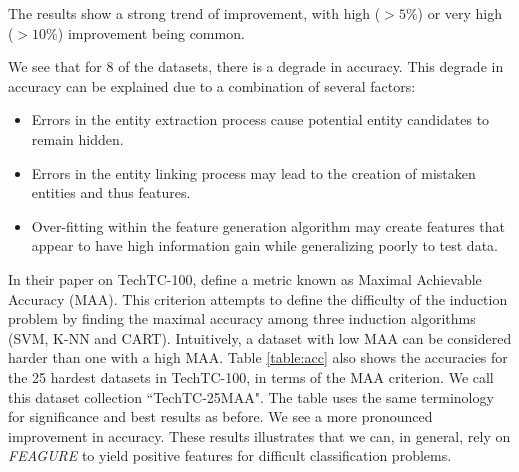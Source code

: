 \documentclass{article}
\theoremstyle{definition}
\begin{document}
The results show a strong trend of improvement, with high ($> 5\%$) or very high ($>10\%$) improvement being common.

We see that for 8 of the datasets, there is a degrade in accuracy. This degrade in accuracy can be explained due to a combination of several factors:
\begin{itemize}
	\item Errors in the entity extraction process cause potential entity candidates to remain hidden.%
	\item Errors in the entity linking process may lead to the creation of mistaken entities and thus features. %
	\item Over-fitting within the feature generation algorithm may create features that appear to have high information gain while generalizing poorly to test data.
\end{itemize} 

In their paper on TechTC-100, \cite{gabrilovich2004text} define a metric known as Maximal Achievable Accuracy (MAA). This criterion attempts to define the difficulty of the induction problem by finding the maximal accuracy among three induction algorithms (SVM, K-NN and CART).
Intuitively, a dataset with low MAA can be considered harder than one with a high MAA.%
Table \ref{table:acc} also shows the accuracies for the 25 hardest datasets in TechTC-100, in terms of the MAA criterion. We call this dataset collection ``TechTC-25MAA". The table uses the same terminology for significance and best results as before.
We see a more pronounced improvement in accuracy.
These results illustrates that we can, in general, rely on \emph{FEAGURE} to yield positive features for difficult classification problems.
\end{document}
